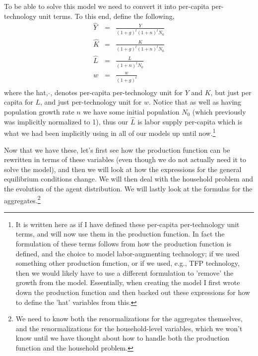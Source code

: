 To be able to solve this model we need to convert it into per-capita per-technology unit terms. To this end, define the following,
\begin{eqnarray*}
 \hat{Y} &=& \frac{Y}{(1+g)^t (1+n)^t N_0} \\
 \hat{K} &=& \frac{K}{(1+g)^t (1+n)^t N_0} \\
 \hat{L} &=& \frac{L}{(1+n)^t N_0} \\
 \hat{w} &=& \frac{w}{(1+g)^t} \\
\end{eqnarray*}
where the hat, $\hat{}$, denotes per-capita per-technology unit for $Y$ and $K$, but just per capita for $L$, and just per-technology unit for $w$. Notice that as well as having population growth rate $n$ we have some initial population $N_0$ (which previously was implicitly normalized to 1), thus our $\hat{L}$ is labor supply per-capita which is what we had been implicitly using in all of our models up until now.\footnote{It is written here as if I have defined these per-capita per-technology unit terms, and will now use them in the production function. In fact the formulation of these terms follows from how the production function is defined, and the choice to model labor-augmenting technology; if we used something other production function, or if we used, e.g., TFP technology, then we would likely have to use a different formulation to 'remove' the growth from the model. Essentially, when creating the model I first wrote down the production function and then backed out these expressions for how to define the 'hat' variables from this.}

Now that we have these, let's first see how the production function can be rewritten in terms of these variables (even though we do not actually need it to solve the model), and then we will look at how the expressions for the general equilibrium conditions change. We will then deal with the household problem and the evolution of the agent distribution.  We will lastly look at the formulas for the aggregates.\footnote{We need to know both the renormalizations for the aggregates themselves, and the renormalizations for the household-level variables, which we won't know until we have thought about how to handle both the production function and the household problem.}

